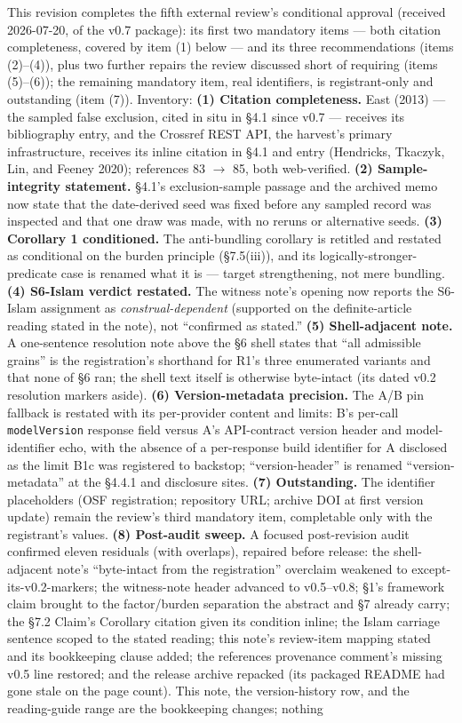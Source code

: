 This revision completes the fifth external review's conditional approval (received 2026-07-20, of the v0.7 package): its first two mandatory items --- both citation completeness, covered by item (1) below --- and its three recommendations (items (2)--(4)), plus two further repairs the review discussed short of requiring (items (5)--(6)); the remaining mandatory item, real identifiers, is registrant-only and outstanding (item (7)). Inventory: \textbf{(1) Citation completeness.} East (2013) --- the sampled false exclusion, cited in situ in \S{}4.1 since v0.7 --- receives its bibliography entry, and the Crossref REST API, the harvest's primary infrastructure, receives its inline citation in \S{}4.1 and entry (Hendricks, Tkaczyk, Lin, and Feeney 2020); references 83 $\to$ 85, both web-verified. \textbf{(2) Sample-integrity statement.} \S{}4.1's exclusion-sample passage and the archived memo now state that the date-derived seed was fixed before any sampled record was inspected and that one draw was made, with no reruns or alternative seeds. \textbf{(3) Corollary 1 conditioned.} The anti-bundling corollary is retitled and restated as conditional on the burden principle (\S{}7.5(iii)), and its logically-stronger-predicate case is renamed what it is --- target strengthening, not mere bundling. \textbf{(4) S6-Islam verdict restated.} The witness note's opening now reports the S6-Islam assignment as \emph{construal-dependent} (supported on the definite-article reading stated in the note), not ``confirmed as stated.'' \textbf{(5) Shell-adjacent note.} A one-sentence resolution note above the \S{}6 shell states that ``all admissible grains'' is the registration's shorthand for R1's three enumerated variants and that none of \S{}6 ran; the shell text itself is otherwise byte-intact (its dated v0.2 resolution markers aside). \textbf{(6) Version-metadata precision.} The A/B pin fallback is restated with its per-provider content and limits: B's per-call \texttt{modelVersion} response field versus A's API-contract version header and model-identifier echo, with the absence of a per-response build identifier for A disclosed as the limit B1c was registered to backstop; ``version-header'' is renamed ``version-metadata'' at the \S{}4.4.1 and disclosure sites. \textbf{(7) Outstanding.} The identifier placeholders (OSF registration; repository URL; archive DOI at first version update) remain the review's third mandatory item, completable only with the registrant's values. \textbf{(8) Post-audit sweep.} A focused post-revision audit confirmed eleven residuals (with overlaps), repaired before release: the shell-adjacent note's ``byte-intact from the registration'' overclaim weakened to except-its-v0.2-markers; the witness-note header advanced to v0.5--v0.8; \S{}1's framework claim brought to the factor/burden separation the abstract and \S{}7 already carry; the \S{}7.2 Claim's Corollary citation given its condition inline; the Islam carriage sentence scoped to the stated reading; this note's review-item mapping stated and its bookkeeping clause added; the references provenance comment's missing v0.5 line restored; and the release archive repacked (its packaged README had gone stale on the page count). This note, the version-history row, and the reading-guide range are the bookkeeping changes; nothing 